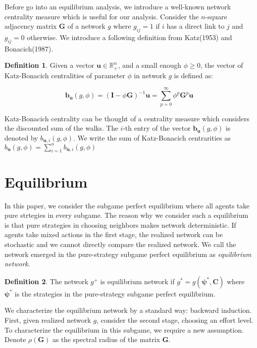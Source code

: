 \documentclass[12pt]{article}
\theoremstyle{definition}
\newtheorem{definition}{Definition}
\begin{document}
Before go into an equilibrium analysis, we introduce a well-known network centrality measure which is useful for our analysis.
Consider the $n$-square adjacency matrix $\bm{G}$ of a network $g$ where $g_{ij} = 1$ if $i$ has a direct link to $j$ and $g_{ij} = 0$ otherwise.
We introduce a following definition from Katz(1953) and Bonacich(1987).

\begin{definition}
Given a vector $\bm{u} \in \mathbb{R}_+^n$, and a small enough $\phi \ge 0$, the vector of Katz-Bonacich centralities of parameter $\phi$ in network $g$ is defined as:

\[ \bm{b}_{\bm{u}}(g, \phi) = {(\bm{I} - \phi \bm{G})}^{-1} \bm{u} = \sum_{p=0}^{\infty} \phi^p \bm{G}^p \bm{u} \]

\end{definition}

Katz-Bonacich centrality can be thought of a centrality measure which considers the discounted sum of the walks.
The $i$-th entry of the vector $\bm{b}_{\bm{u}}(g, \phi)$ is denoted by $b_{\bm{u}, i}(g, \phi)$.
We write the sum of Katz-Bonacich centrarities as $b_{\bm{u}}(g, \phi) = \sum_{i=1}^n b_{\bm{u}, i}(g, \phi)$


\section{Equilibrium}

In this paper, we consider the subgame perfect equilibrium where all agents take pure strtegies in every subgame.
The reason why we consider such a equilibrium is that pure strategies in choosing neighbors makes network deterministic.
If agents take mixed actions in the first stage, the realized network can be stochastic and we cannot directly compare the realized network.
We call the network emerged in the pure-strategy subgame perfect equilibrium as {\it{equilibrium network}}.

\begin{definition}
The network $g^+$ is equilibrium network if $g^* = g(\bm{\psi}^*, \bm{C})$ where $\bm{\psi}^*$ is the strategies in the pure-strategy subgame perfect equilibrium.
\end{definition}

We characterize the equilibrium network by a standard way: backward induction.
First, given realized network $g$, consider the second stage, choosing an effort level.
To characterize the equilibrium in this subgame, we require a new assumption.
Denote $\rho (\bm{G})$ as the spectral radius of the matrix $\bm{G}$.
\end{document}
